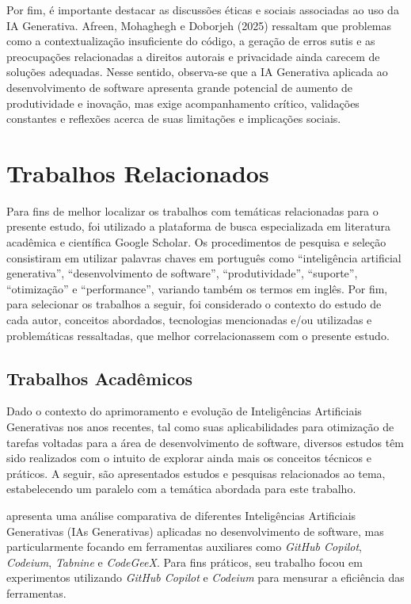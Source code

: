\documentclass[english,brazilian]{UNISINOSartigo} %
\begin{document}
Por fim, é importante destacar as discussões éticas e sociais associadas ao uso da IA Generativa. Afreen, Mohaghegh e Doborjeh (2025) ressaltam que problemas como a contextualização insuficiente do código, a geração de erros sutis e as preocupações relacionadas a direitos autorais e privacidade ainda carecem de soluções adequadas. Nesse sentido, observa-se que a IA Generativa aplicada ao desenvolvimento de software apresenta grande potencial de aumento de produtividade e inovação, mas exige acompanhamento crítico, validações constantes e reflexões acerca de suas limitações e implicações sociais.

\section{Trabalhos Relacionados}

Para fins de melhor localizar os trabalhos com temáticas relacionadas para o presente estudo, foi utilizado a plataforma de busca especializada em literatura acadêmica e científica Google Scholar. Os procedimentos de pesquisa e seleção consistiram em utilizar palavras chaves em português como “inteligência artificial generativa”, “desenvolvimento de software”, “produtividade”, “suporte”, “otimização” e “performance”, variando também os termos em inglês. Por fim, para selecionar os trabalhos a seguir, foi considerado o contexto do estudo de cada autor, conceitos abordados, tecnologias mencionadas e/ou utilizadas e problemáticas ressaltadas, que melhor correlacionassem com o presente estudo.

\subsection{Trabalhos Acadêmicos}

Dado o contexto do aprimoramento e evolução de Inteligências Artificiais Generativas nos anos recentes, tal como suas aplicabilidades para otimização de tarefas voltadas para a área de desenvolvimento de software, diversos estudos têm sido realizados com o intuito de explorar ainda mais os conceitos técnicos e práticos. A seguir, são apresentados estudos e pesquisas relacionados ao tema, estabelecendo um paralelo com a temática abordada para este trabalho.

 apresenta uma análise comparativa de diferentes Inteligências Artificiais Generativas (IAs Generativas) aplicadas no desenvolvimento de software, mas particularmente focando em ferramentas auxiliares como \textit{GitHub Copilot}, \textit{Codeium}, \textit{Tabnine} e \textit{CodeGeeX}. Para fins práticos, seu trabalho focou em experimentos utilizando \textit{GitHub Copilot} e \textit{Codeium} para mensurar a eficiência das ferramentas.
\end{document}

